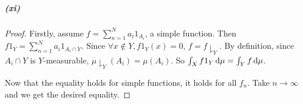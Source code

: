 \documentclass{article}
\begin{document}
\subparagraph{(xi)}
\begin{proof}
Firstly, assume $f=\sum\limits_{n=1}^{N}a_i1_{A_i}$, a simple function. Then $f1_Y=\sum\limits_{n=1}^{N}a_i1_{A_i\cap Y}$. Since $\forall x\not\in Y, f1_Y(x)=0$, $f=f\downharpoonright_{Y}$. By definition, since $A_i\cap Y$ is $Y$-measurable, $\mu\downharpoonright_{Y}(A_i)=\mu(A_i)$. So $\int_{X} f1_{Y}\,\mathrm{d} \mu=\int_{Y}f\,\mathrm{d} \mu$.

Now that the equality holds for simple functions, it holds for all $f_n$. Take $n\to\infty$ and we get the desired equality.
\end{proof}
\end{document}
